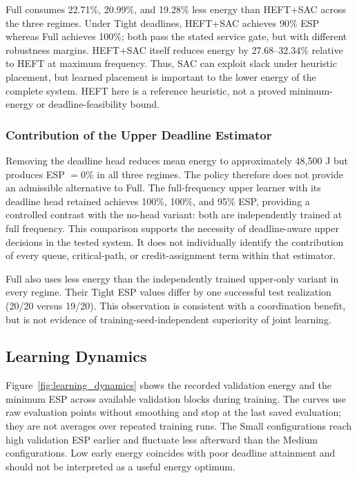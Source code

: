 Full consumes 22.71\%, 20.99\%, and 19.28\% less energy than
HEFT+SAC across the three regimes. Under Tight deadlines, HEFT+SAC
achieves 90\% ESP whereas Full achieves 100\%; both pass the stated
service gate, but with different robustness margins. HEFT+SAC itself
reduces energy by 27.68--32.34\% relative to HEFT at maximum frequency.
Thus, SAC can exploit slack under heuristic placement, but learned
placement is important to the lower energy of the complete system.
HEFT here is a reference heuristic, not a proved minimum-energy or
deadline-feasibility bound.

\subsubsection{Contribution of the Upper Deadline Estimator}

Removing the deadline head reduces mean energy to approximately
48,500 J but produces ESP $=0\%$ in all three regimes. The policy
therefore does not provide an admissible alternative to Full.
The full-frequency upper learner with its deadline head retained
achieves 100\%, 100\%, and 95\% ESP, providing a controlled contrast
with the no-head variant: both are independently trained at
full frequency. This comparison supports the necessity of
deadline-aware upper decisions in the tested system.
It does not individually identify the contribution of every queue,
critical-path, or credit-assignment term within that estimator.

Full also uses less energy than the independently trained upper-only
variant in every regime. Their Tight ESP values differ by one
successful test realization (20/20 versus 19/20). This observation
is consistent with a coordination benefit, but is not evidence of
training-seed-independent superiority of joint learning.

\subsection{Learning Dynamics}
\label{subsec:learning_dynamics}

Figure~\ref{fig:learning_dynamics} shows the recorded validation
energy and the minimum ESP across available validation blocks
during training. The curves use raw evaluation points without
smoothing and stop at the last saved evaluation; they are not
averages over repeated training runs. The Small configurations
reach high validation ESP earlier and fluctuate less afterward
than the Medium configurations. Low early energy coincides with
poor deadline attainment and should not be interpreted as a useful
energy optimum.

